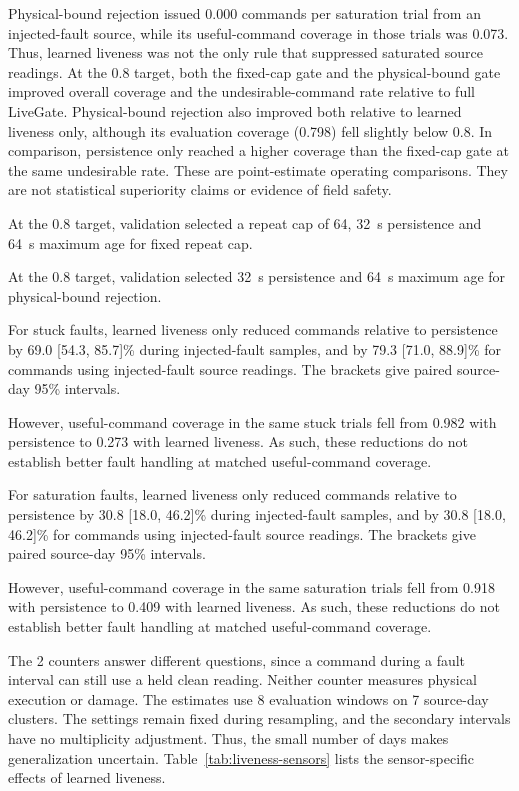 Physical-bound rejection issued 0.000 commands per saturation trial from an injected-fault source, while its useful-command coverage in those trials was 0.073. Thus, learned liveness was not the only rule that suppressed saturated source readings. At the 0.8 target, both the fixed-cap gate and the physical-bound gate improved overall coverage and the undesirable-command rate relative to full LiveGate. Physical-bound rejection also improved both relative to learned liveness only, although its evaluation coverage (0.798) fell slightly below 0.8. In comparison, persistence only reached a higher coverage than the fixed-cap gate at the same undesirable rate. These are point-estimate operating comparisons. They are not statistical superiority claims or evidence of field safety.

At the 0.8 target, validation selected a repeat cap of 64, 32~s persistence and 64~s maximum age for fixed repeat cap.

At the 0.8 target, validation selected 32~s persistence and 64~s maximum age for physical-bound rejection.

For stuck faults, learned liveness only reduced commands relative to persistence by 69.0 [54.3, 85.7]\% during injected-fault samples, and by 79.3 [71.0, 88.9]\% for commands using injected-fault source readings. The brackets give paired source-day 95\% intervals.

However, useful-command coverage in the same stuck trials fell from 0.982 with persistence to 0.273 with learned liveness. As such, these reductions do not establish better fault handling at matched useful-command coverage.

For saturation faults, learned liveness only reduced commands relative to persistence by 30.8 [18.0, 46.2]\% during injected-fault samples, and by 30.8 [18.0, 46.2]\% for commands using injected-fault source readings. The brackets give paired source-day 95\% intervals.

However, useful-command coverage in the same saturation trials fell from 0.918 with persistence to 0.409 with learned liveness. As such, these reductions do not establish better fault handling at matched useful-command coverage.

The 2 counters answer different questions, since a command during a fault interval can still use a held clean reading. Neither counter measures physical execution or damage. The estimates use 8 evaluation windows on 7 source-day clusters. The settings remain fixed during resampling, and the secondary intervals have no multiplicity adjustment. Thus, the small number of days makes generalization uncertain. Table~\ref{tab:liveness-sensors} lists the sensor-specific effects of learned liveness.

